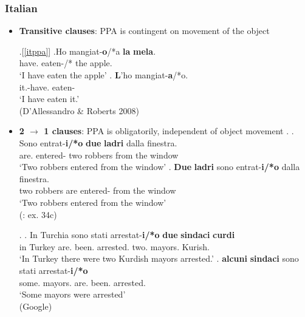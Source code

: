\documentclass[letterpaper,10pt]{handout_nick}
\begin{document}
\subsubsection{Italian}
\begin{itemize}
\item {\bf Transitive clauses}: PPA is contingent on movement of the object
\begin{multicols}{2}
\ex.[\ref{itppa}] 
\ag.\hspace*{-.3cm}Ho mangiat-{\bf o}/*a {\bf la} {\bf mela}.\\
\hspace*{-.3cm}have. eaten-/* the {apple.}\\
\hspace*{-.3cm}`I have eaten the apple'
\bg. {\bf L}'ho mangiat-{\bf a}/*o.\\
it.-have. eaten-\\
`I have eaten it.'\\(D'Allessandro \& Roberts 2008)

\end{multicols}
\item {\bf 2 $\rightarrow$ 1 clauses}: PPA is obligatorily, independent of object movement
\ex. 
\ag. Sono entrat-{\bf i/*o} {\bf due} {\bf ladri} dalla finestra. \\
are. entered- two robbers {from the} window\\
`Two robbers entered from the window'
\bg. {\bf Due} {\bf ladri} sono entrat-{\bf i/*o}  dalla finestra.\\
two robbers are entered- {from the} window\\
`Two robbers entered from the window'\\
(\citealt{belletti06}: ex. 34c)

\ex. 
\ag. In Turchia sono stati arrestat-{\bf i/*o} {\bf due} {\bf sindaci} {\bf curdi}\\
in Turkey are. been. arrested. two. mayors. Kurish.\\
`In Turkey there were two Kurdish mayors arrested.'
\bg. {\bf alcuni} {\bf sindaci} sono stati arrestat-{\bf i/*o}\\
some. mayors. are. been. arrested.\\
`Some mayors were arrested'\\
(Google)


\end{itemize}
\end{document}
